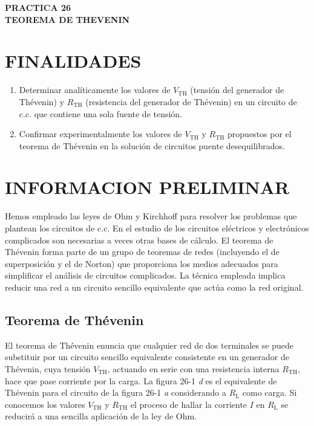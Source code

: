 \documentclass[a4paper,12pt]{article}
\begin{document}
\begin{center}
    \textbf{PRACTICA 26} \\[0.5cm]
    \textbf{\large TEOREMA DE THEVENIN}
\end{center}

\tableofcontents
\newpage

\section{FINALIDADES}

\begin{enumerate}
    \item Determinar analíticamente los valores de $V_{\text{TH}}$ (tensión del generador de Thévenin) y $R_{\text{TH}}$ (resistencia del generador de Thévenin) en un circuito de c.c. que contiene una sola fuente de tensión.
    \item Confirmar experimentalmente los valores de $V_{\text{TH}}$ y $R_{\text{TH}}$ propuestos por el teorema de Thévenin en la solución de circuitos puente desequilibrados.
\end{enumerate}

\section{INFORMACION PRELIMINAR}

Hemos empleado las leyes de Ohm y Kirchhoff para resolver los problemas que plantean los circuitos de c.c. En el estudio de los circuitos eléctricos y electrónicos complicados son necesarias a veces otras bases de cálculo. El teorema de Thévenin forma parte de un grupo de teoremas de redes (incluyendo el de superposición y el de Norton) que proporciona los medios adecuados para simplificar el análisis de circuitos complicados. La técnica empleada implica reducir una red a un circuito sencillo equivalente que actúa como la red original.

\subsection{Teorema de Thévenin}

El teorema de Thévenin enuncia que cualquier red de dos terminales se puede substituir por un circuito sencillo equivalente consistente en un generador de Thévenin, cuya tensión $V_{\text{TH}}$, actuando en serie con una resistencia interna $R_{\text{TH}}$, hace que pase corriente por la carga. La figura 26-1 \textit{d} es el equivalente de Thévenin para el circuito de la figura 26-1 \textit{a} considerando a $R_{\text{L}}$ como carga. Si conocemos los valores $V_{\text{TH}}$ y $R_{\text{TH}}$ el proceso de hallar la corriente $I$ en $R_{\text{L}}$ se reducirá a una sencilla aplicación de la ley de Ohm.
\end{document}
